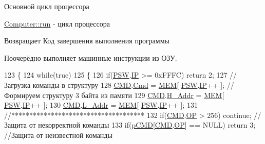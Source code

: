 Основной цикл процессора 

\hyperlink{class_computer_af337e329e3bc6d80bbd7070e25ce5731}{Computer\+::run} -\/ цикл процессора

\begin{DoxyReturn}{Возвращает}
Код завершения выполнения программы
\end{DoxyReturn}
Поочерёдно выполняет машинные инструкции из ОЗУ. 
\begin{DoxyCode}
123 \{
124     \textcolor{keywordflow}{while}(\textcolor{keyword}{true})
125     \{
126         \textcolor{keywordflow}{if}(\hyperlink{class_computer_aada011a29d87bb979835371a5f09805e}{PSW}.\hyperlink{struct_computer_1_1bits_a7781883b446209714ad687e2a4f77526}{IP} >= 0xFFFC) \textcolor{keywordflow}{return} 2;
127         \textcolor{comment}{//Загрузка команды в структуру}
128         \hyperlink{class_computer_a8423168f7cc356b4dd36977603798caf}{CMD}.\hyperlink{struct_computer_1_1command_afd02c65efae303e5c528aab2eaa17556}{Cmd}     =   \hyperlink{class_computer_adcd1bd438b7ad95f043db2acbbd864ae}{MEM}[ \hyperlink{class_computer_aada011a29d87bb979835371a5f09805e}{PSW}.\hyperlink{struct_computer_1_1bits_a7781883b446209714ad687e2a4f77526}{IP}++ ];   \textcolor{comment}{//Формируем структуру 3 байта из памяти}
129         \hyperlink{class_computer_a8423168f7cc356b4dd36977603798caf}{CMD}.\hyperlink{struct_computer_1_1command_a840bf646fc591a80cd94f253bb8cae02}{H\_Addr}  =   \hyperlink{class_computer_adcd1bd438b7ad95f043db2acbbd864ae}{MEM}[ \hyperlink{class_computer_aada011a29d87bb979835371a5f09805e}{PSW}.\hyperlink{struct_computer_1_1bits_a7781883b446209714ad687e2a4f77526}{IP}++ ];
130         \hyperlink{class_computer_a8423168f7cc356b4dd36977603798caf}{CMD}.\hyperlink{struct_computer_1_1command_afe8e3496cc61746a889f53f91ed66d45}{L\_Addr}  =   \hyperlink{class_computer_adcd1bd438b7ad95f043db2acbbd864ae}{MEM}[ \hyperlink{class_computer_aada011a29d87bb979835371a5f09805e}{PSW}.\hyperlink{struct_computer_1_1bits_a7781883b446209714ad687e2a4f77526}{IP}++ ];
131         \textcolor{comment}{//*************************************}
132         \textcolor{keywordflow}{if}(\hyperlink{class_computer_a8423168f7cc356b4dd36977603798caf}{CMD}.\hyperlink{struct_computer_1_1command_a2714eda12dcfba46770769c7ed9c7f0a}{OP} > 256) \textcolor{keywordflow}{continue};  \textcolor{comment}{//Защита от некорректной команды}
133         \textcolor{keywordflow}{if}(\hyperlink{class_computer_a297a9b79381a9f2005c574f09ea73d70}{pCMD}[\hyperlink{class_computer_a8423168f7cc356b4dd36977603798caf}{CMD}.\hyperlink{struct_computer_1_1command_a2714eda12dcfba46770769c7ed9c7f0a}{OP}] == NULL) \textcolor{keywordflow}{return} 3;  \textcolor{comment}{//Защита от неизвестной команды}

\end{DoxyCode}
